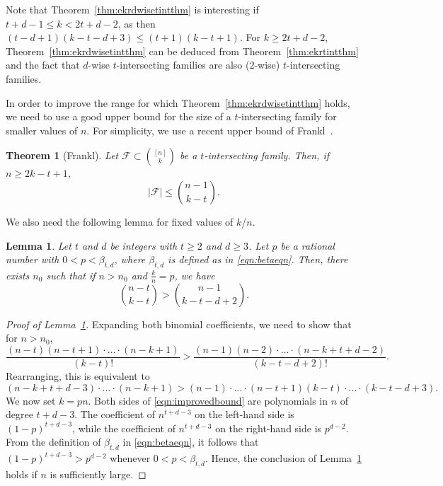 \documentclass[12pt]{article}
\newtheorem{theorem}{Theorem}
\newtheorem{lemma}{Lemma}
\theoremstyle{definition}
\newcommand{\cF}{\mathcal{F}}
\begin{document}
Note that Theorem~\ref{thm:ekrdwisetintthm} is interesting if $t+d-1 \le k < 2t+d-2$, as then $(t-d+1)(k-t-d+3) \le (t+1)(k-t+1)$. For $k \ge 2t+d-2$, Theorem~\ref{thm:ekrdwisetintthm} can be deduced from Theorem~\ref{thm:ekrtintthm} and the fact that $d$-wise $t$-intersecting families are also ($2$-wise) $t$-intersecting families. 

In order to improve the range for which Theorem~\ref{thm:ekrdwisetintthm} holds, we need to use a good upper bound for the size of a $t$-intersecting family for smaller values of $n$.  For simplicity, we use a recent upper bound of Frankl~\cite{F1}. 

\begin{theorem}[Frankl]\label{thm:n-1k-tthm}
Let $\cF \subset \binom{[n]}{k}$ be a $t$-intersecting family. Then, if $n \ge 2k-t+1$, 
\[|\cF|\le \binom{n-1}{k-t}.\]
\end{theorem}

We also need the following lemma for fixed values of $k$/$n$. 

\begin{lemma}\label{pbetalem}
Let $t$ and $d$ be integers with $t\ge 2$ and $d\ge 3$. Let $p$ be a rational number with $0 < p < \beta_{t, d}$, where $\beta_{t, d}$ is defined as in \eqref{eqn:betaeqn}. Then, there exists $n_0$ such that if $n > n_0$ and $\frac{k}{n} = p$, we have
\[\binom{n-t}{k-t} > \binom{n-1}{k-t-d+2}.\]
\end{lemma}

\begin{proof}[Proof of Lemma~\ref{pbetalem}]
Expanding both binomial coefficients, we need to show that for $n > n_0$, 
\[\frac{(n-t)(n-t+1)\cdot\ldots\cdot(n-k+1)}{(k-t)!} > \frac{(n-1)(n-2)\cdot\ldots\cdot(n-k+t+d-2)}{(k-t-d+2)!}.\]
Rearranging, this is equivalent to 
\begin{equation}\label{eqn:improvedbound}
(n-k+t+d-3)\cdot\ldots\cdot (n-k+1) > (n-1)\cdot\ldots\cdot(n-t+1)(k-t)\cdot\ldots\cdot(k-t-d+3).
\end{equation}
We now set $k=pn$. Both sides of \eqref{eqn:improvedbound} are polynomials in $n$ of degree $t+d-3$. The coefficient of $n^{t+d-3}$ on the left-hand side is $(1-p)^{t+d-3}$, while the coefficient of $n^{t+d-3}$ on the right-hand side is $p^{d-2}$. From the definition of $\beta_{t, d}$ in \eqref{eqn:betaeqn}, it follows that $(1-p)^{t+d-3} > p^{d-2}$ whenever $0 < p < \beta_{t, d}$. Hence, the conclusion of Lemma~\ref{pbetalem} holds if $n$ is sufficiently large. 
\end{proof}
\end{document}
